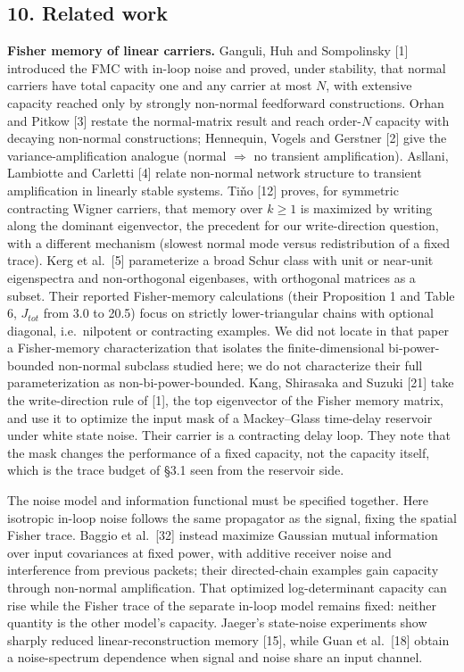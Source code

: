 \documentclass[
  10pt,
]{article}
\begin{document}
\subsection{10. Related work}\label{related-work}

\textbf{Fisher memory of linear carriers.} Ganguli, Huh and Sompolinsky
{[}1{]} introduced the FMC with in-loop noise and proved, under
stability, that normal carriers have total capacity one and any carrier
at most \(N\), with extensive capacity reached only by strongly
non-normal feedforward constructions. Orhan and Pitkow {[}3{]} restate
the normal-matrix result and reach order-\(N\) capacity with decaying
non-normal constructions; Hennequin, Vogels and Gerstner {[}2{]} give
the variance-amplification analogue (normal \(\Rightarrow\) no transient
amplification). Asllani, Lambiotte and Carletti {[}4{]} relate
non-normal network structure to transient amplification in linearly
stable systems. Tiňo {[}12{]} proves, for symmetric contracting Wigner
carriers, that memory over \(k\ge1\) is maximized by writing along the
dominant eigenvector, the precedent for our write-direction question,
with a different mechanism (slowest normal mode versus redistribution of
a fixed trace). Kerg et al.~{[}5{]} parameterize a broad Schur class
with unit or near-unit eigenspectra and non-orthogonal eigenbases, with
orthogonal matrices as a subset. Their reported Fisher-memory
calculations (their Proposition 1 and Table 6, \(J_{tot}\) from 3.0 to
20.5) focus on strictly lower-triangular chains with optional diagonal,
i.e.~nilpotent or contracting examples. We did not locate in that paper
a Fisher-memory characterization that isolates the finite-dimensional
bi-power-bounded non-normal subclass studied here; we do not
characterize their full parameterization as non-bi-power-bounded. Kang,
Shirasaka and Suzuki {[}21{]} take the write-direction rule of {[}1{]},
the top eigenvector of the Fisher memory matrix, and use it to optimize
the input mask of a Mackey--Glass time-delay reservoir under white state
noise. Their carrier is a contracting delay loop. They note that the
mask changes the performance of a fixed capacity, not the capacity
itself, which is the trace budget of §3.1 seen from the reservoir side.

The noise model and information functional must be specified together.
Here isotropic in-loop noise follows the same propagator as the signal,
fixing the spatial Fisher trace. Baggio et al.~{[}32{]} instead maximize
Gaussian mutual information over input covariances at fixed power, with
additive receiver noise and interference from previous packets; their
directed-chain examples gain capacity through non-normal amplification.
That optimized log-determinant capacity can rise while the Fisher trace
of the separate in-loop model remains fixed: neither quantity is the
other model's capacity. Jaeger's state-noise experiments show sharply
reduced linear-reconstruction memory {[}15{]}, while Guan et
al.~{[}18{]} obtain a noise-spectrum dependence when signal and noise
share an input channel.
\end{document}
